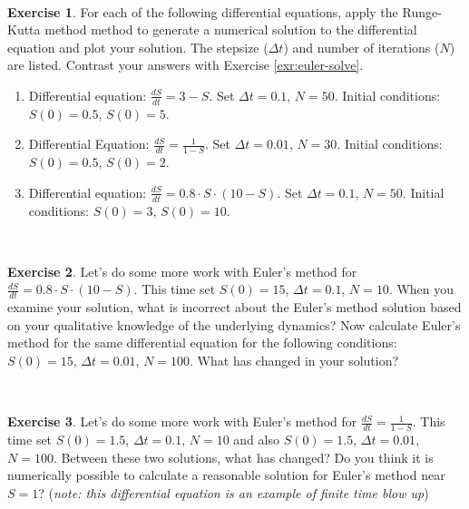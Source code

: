 \documentclass[
]{book}
\theoremstyle{definition}
\theoremstyle{definition}
\theoremstyle{definition}
\newtheorem{exercise}{Exercise}[chapter]
\theoremstyle{remark}
\begin{document}
~

\begin{exercise}
\protect\hypertarget{exr:unnamed-chunk-71}{}{\label{exr:unnamed-chunk-71} }For each of the following differential equations, apply the Runge-Kutta method method to generate a numerical solution to the differential equation and plot your solution. The stepsize (\(\Delta t\)) and number of iterations (\(N\)) are listed. Contrast your answers with Exercise \ref{exr:euler-solve}.

\begin{enumerate}[label=\alph*.]
\item Differential equation: $\displaystyle \frac{dS}{dt} =3-S$. Set $\Delta t = 0.1$, $N = 50$. Initial conditions:  $S(0) = 0.5$, $S(0) = 5$.
\item Differential Equation: $\displaystyle \frac{dS}{dt} =\frac{1}{1-S}$. Set $\Delta t = 0.01$, $N = 30$. Initial conditions:  $S(0) = 0.5$, $S(0) = 2$.
\item Differential equation: $\displaystyle \frac{dS}{dt} = 0.8 \cdot S \cdot (10-S)$. Set $\Delta t = 0.1$, $N = 50$. Initial conditions:  $S(0) = 3$, $S(0) = 10$.
\end{enumerate}
\end{exercise}

~

\begin{exercise}
\protect\hypertarget{exr:unnamed-chunk-72}{}{\label{exr:unnamed-chunk-72} }Let's do some more work with Euler's method for \(\displaystyle \frac{dS}{dt} = 0.8 \cdot S \cdot (10-S)\). This time set \(S(0)=15\), \(\Delta t = 0.1\), \(N = 10\).
When you examine your solution, what is incorrect about the Euler's method solution based on your qualitative knowledge of the underlying dynamics? Now calculate Euler's method for the same differential equation for the following conditions: \(S(0)=15\), \(\Delta t = 0.01\), \(N = 100\). What has changed in your solution?
\end{exercise}

~

\begin{exercise}
\protect\hypertarget{exr:euler-ftbu}{}{\label{exr:euler-ftbu} }Let's do some more work with Euler's method for \(\displaystyle \frac{dS}{dt} =\frac{1}{1-S}\). This time set \(S(0)=1.5\), \(\Delta t = 0.1\), \(N = 10\) and also \(S(0)=1.5\), \(\Delta t = 0.01\), \(N = 100\). Between these two solutions, what has changed? Do you think it is numerically possible to calculate a reasonable solution for Euler's method near \(S=1\)? (\emph{note: this differential equation is an example of finite time blow up})
\end{exercise}
\end{document}
